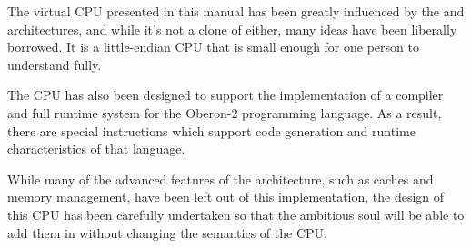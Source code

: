 
The virtual \ac{CPU} presented in this manual has been greatly
influenced by the \mips and \natsemi architectures, and while it's not
a clone of either, many ideas have been liberally borrowed.  It is a
little-endian \ac{CPU} that is small enough for one person to
understand fully.

The \ac{CPU} has also been designed to support the implementation of a
compiler and full runtime system for the Oberon-2 programming
language.  As a result, there are special instructions which support
code generation and runtime characteristics of that language.

While many of the advanced features of the \mips architecture, such as
caches and memory management, have been left out of this
implementation, the design of this \ac{CPU} has been carefully
undertaken so that the ambitious soul will be able to add them in
without changing the semantics of the \ac{CPU}.
